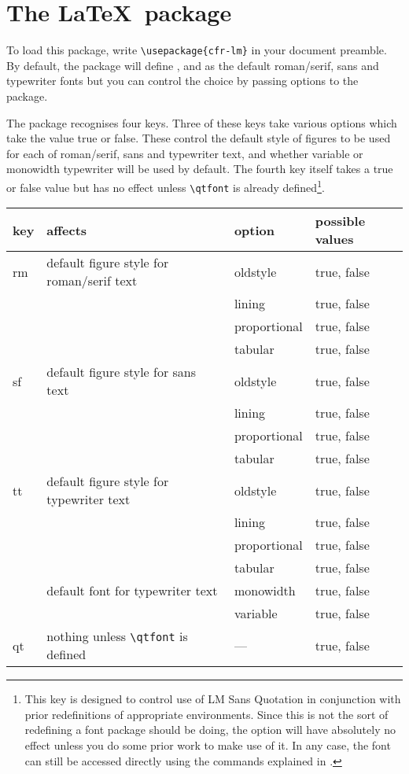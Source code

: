 \documentclass[11pt,british]{article}
\begin{document}
\section{The \LaTeX\ package}\label{sec:support}

To load this package, write \verb|\usepackage{cfr-lm}| in your document preamble. By default, the package will define ,  and  as the default roman/serif, sans and typewriter fonts but you can control the choice by passing options to the package.
	
The package recognises four keys. Three of these keys take various options which take the value true or false. These control the default style of figures to be used for each of roman/serif, sans and typewriter text, and whether variable or monowidth typewriter will be used by default. The fourth key itself takes a true or false value but has no effect unless \verb|\qtfont| is already defined\footnote{This key is designed to control use of LM Sans Quotation in conjunction with prior redefinitions of appropriate environments. Since this is not the sort of redefining a font package should be doing, the option will have absolutely no effect unless you do some prior work to make use of it. In any case, the font can still be accessed directly using the commands explained in .}. 
	\begin{longtable}{l>{\raggedright}p{}>{\raggedright}ll}
		\toprule
		\textbf{key}	&	\textbf{affects}	&	\textbf{option}	&	 \textbf{possible values}\tabularnewline\midrule\endhead
		\bottomrule\endfoot
		rm	& default figure style for roman/serif text	&	oldstyle				&	true, false			\tabularnewline\cmidrule{3-4}
				&																					&	lining					&	true, false			\tabularnewline\cmidrule{3-4}
				&																					&	proportional		&	true, false			\tabularnewline\cmidrule{3-4}
				&																					&	tabular				&	true, false			\tabularnewline\midrule
		sf		& default figure style for sans text					&	oldstyle				&	true, false			\tabularnewline\cmidrule{3-4}
				&																					&	lining					&	true, false			\tabularnewline\cmidrule{3-4}
				&																					&	proportional		&	true, false			\tabularnewline\cmidrule{3-4}
				&																					&	tabular				&	true, false			\tabularnewline\midrule
		tt		& default figure style for typewriter text		&	oldstyle				&	true, false			\tabularnewline\cmidrule{3-4}
				&																					&	lining					&	true, false			\tabularnewline\cmidrule{3-4}
				&																					&	proportional		&	true, false			\tabularnewline\cmidrule{3-4}
				&																					&	tabular				&	true, false			\tabularnewline\cmidrule{2-4}
				&	default font for typewriter text					&	monowidth			&	true, false			\tabularnewline\cmidrule{3-4}
				& 																					&	variable				&	true, false			\tabularnewline\midrule
		qt		&	nothing unless \verb|\qtfont| is defined		&	---						&	true, false			\tabularnewline
	\end{longtable}
\end{document}
